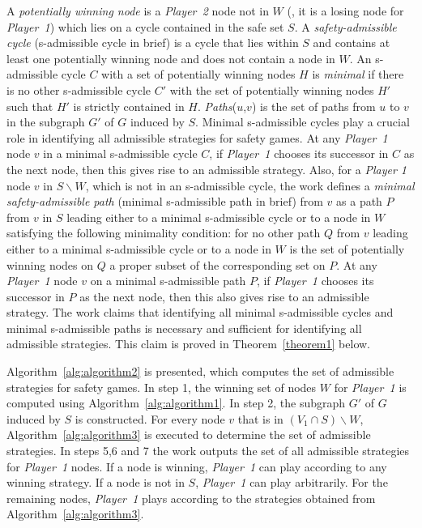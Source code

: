 A \textit{potentially winning node} is a \textit{Player~2} node not in
$W$ (\ie, it is a losing node for \textit{Player~1}) which lies on a
cycle contained in the safe set $S$. A \textit{safety-admissible
	cycle} (s-admissible cycle in brief) is a cycle that lies within $S$
and contains at least one potentially winning node and does not
contain a node in $W$. An s-admissible cycle $C$ with a set of
potentially winning nodes $H$ is \textit{minimal} if there is no other
s-admissible cycle $C'$ with the set of potentially winning nodes $H'$
such that $H'$ is strictly contained in $H$. \textit{Paths}($u$,$v$)
is the set of paths from $u$ to $v$ in the subgraph $G'$ of $G$
induced by $S$. Minimal s-admissible cycles play a crucial role in
identifying all admissible strategies for safety games. At any
\textit{Player~1} node $v$ in a minimal s-admissible cycle $C$, if
\textit{Player~1} chooses its successor in $C$ as the next node, then
this gives rise to an admissible strategy. Also, for a \textit{Player
	1} node $v$ in $S \backslash W$, which is not in an s-admissible
cycle, the work defines a \textit{minimal safety-admissible path} (minimal
s-admissible path in brief) from $v$ as a path $P$ from $v$ in $S$
leading either to a minimal s-admissible cycle or to a node in $W$
satisfying the following minimality condition: for no other path $Q$
from $v$ leading either to a minimal s-admissible cycle or to a node
in $W$ is the set of potentially winning nodes on $Q$ a proper subset
of the corresponding set on $P$. At any \textit{Player~1} node $v$ on a
minimal s-admissible path $P$, if \textit{Player~1} chooses its
successor in $P$ as the next node, then this also gives rise to an
admissible strategy. The work claims that identifying all minimal
s-admissible cycles and minimal s-admissible paths is necessary and
sufficient for identifying all admissible strategies. This claim is
proved in Theorem~\ref{theorem1} below.

Algorithm~\ref{alg:algorithm2} is presented, which computes
the set of admissible strategies for safety games. In step 1, the winning set of nodes $W$ for \textit{Player~1} is computed using
Algorithm~\ref{alg:algorithm1}. In step 2, the subgraph
$G'$ of $G$ induced by $S$ is constructed. For every node $v$ that is in $(V_{1} \cap
S) \backslash W$, Algorithm~\ref{alg:algorithm3} is executed to determine the set of admissible strategies. In steps 5,6 and 7 the work outputs the set of all admissible strategies for \textit{Player~1}
nodes. If a node is winning, \textit{Player~1} can play according to
any winning strategy. If a node is not in $S$, \textit{Player~1} can
play arbitrarily. For the remaining nodes, \textit{Player~1} plays
according to the strategies obtained from Algorithm~\ref{alg:algorithm3}.


